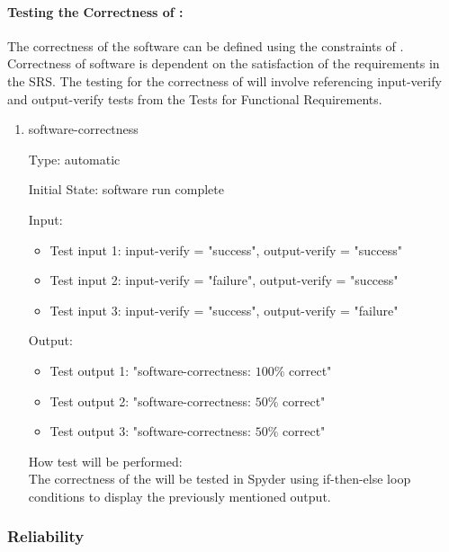 \documentclass[12pt, titlepage]{article}
\begin{document}
\paragraph{Testing the Correctness of \progname{}:}
The correctness of the software can be defined using the constraints of 
\progname{}. Correctness of software is dependent on the satisfaction of the 
requirements in the SRS. The testing for the correctness of \progname{} will 
involve referencing input-verify and output-verify tests from the Tests for 
Functional Requirements.

\begin{enumerate}

\item{software-correctness\\}

Type: automatic
					
Initial State: \progname{} software run complete
					
Input:
\begin{itemize} %
\item Test input 1: input-verify = "success", output-verify = "success"
\item Test input 2: input-verify = "failure", output-verify = "success"
\item Test input 3: input-verify = "success", output-verify = "failure"
\end{itemize}

Output: 
\begin{itemize}
\item Test output 1: "software-correctness: $100\%$ correct"
\item Test output 2: "software-correctness: $50\%$ correct" 
\item Test output 3: "software-correctness: $50\%$ correct"
\end{itemize}
					
How test will be performed: \\
The correctness of the \progname{} will be tested in Spyder using if-then-else 
loop conditions to display the previously mentioned output. \\

\end{enumerate}

\subsubsection{Reliability}
\end{document}
